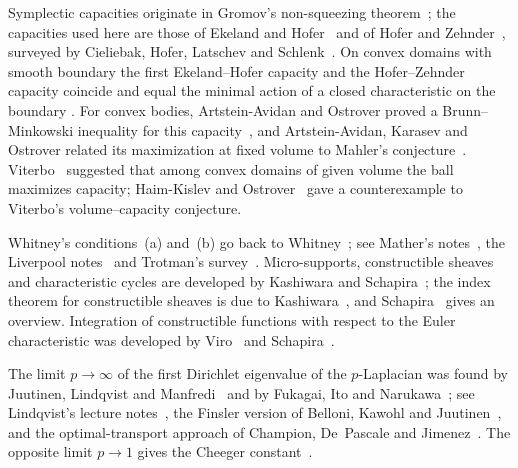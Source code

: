\documentclass[11pt,a4paper,reqno]{amsart}
\theoremstyle{definition}
\theoremstyle{remark}
\numberwithin{equation}{section}
\begin{document}
Symplectic capacities originate in Gromov's non-squeezing theorem~\cite{Gromov1985}; the capacities used here are those of Ekeland and Hofer~\cite{EkelandHofer1989,EkelandHofer1990} and of Hofer and Zehnder~\cite{HoferZehnder1994}, surveyed by Cieliebak, Hofer, Latschev and Schlenk~\cite{CieliebakHoferLatschevSchlenk2005}. On convex domains with smooth boundary the first Ekeland--Hofer capacity and the Hofer--Zehnder capacity coincide and equal the minimal action of a closed characteristic on the boundary \cite[Theorem~1.3]{ArtsteinAvidanOstrover2008}. For convex bodies, Artstein-Avidan and Ostrover proved a Brunn--Minkowski inequality for this capacity~\cite{ArtsteinAvidanOstrover2008}, and Artstein-Avidan, Karasev and Ostrover related its maximization at fixed volume to Mahler's conjecture~\cite{ArtsteinAvidanKarasevOstrover2014}. Viterbo~\cite{Viterbo2000} suggested that among convex domains of given volume the ball maximizes capacity; Haim-Kislev and Ostrover~\cite{HaimKislevOstrover2026} gave a counterexample to Viterbo's volume--capacity conjecture.

Whitney's conditions~(a) and~(b) go back to Whitney~\cite{Whitney1965}; see Mather's notes~\cite{Mather2012}, the Liverpool notes~\cite{GibsonEtAl1976} and Trotman's survey~\cite{Trotman2020}. Micro-supports, constructible sheaves and characteristic cycles are developed by Kashiwara and Schapira~\cite{KashiwaraSchapira1990}; the index theorem for constructible sheaves is due to Kashiwara~\cite{Kashiwara1985}, and Schapira~\cite{Schapira2017} gives an overview. Integration of constructible functions with respect to the Euler characteristic was developed by Viro~\cite{Viro1988} and Schapira~\cite{Schapira1991}.

The limit $p\to\infty$ of the first Dirichlet eigenvalue of the $p$-Laplacian was found by Juutinen, Lindqvist and Manfredi~\cite{JuutinenLindqvistManfredi1999} and by Fukagai, Ito and Narukawa~\cite{FukagaiItoNarukawa1999}; see Lindqvist's lecture notes~\cite{Lindqvist2008}, the Finsler version of Belloni, Kawohl and Juutinen~\cite{BelloniKawohlJuutinen2006}, and the optimal-transport approach of Champion, De~Pascale and Jimenez~\cite{ChampionDePascaleJimenez2008}. The opposite limit $p\to1$ gives the Cheeger constant~\cite{Cheeger1970,KawohlFridman2003}.
\end{document}
